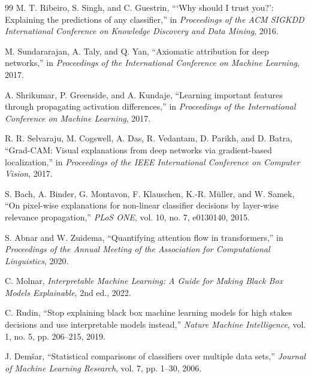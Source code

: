\documentclass[10pt,conference]{IEEEtran}
\begin{document}
\begin{thebibliography}{99}
M. T. Ribeiro, S. Singh, and C. Guestrin, ```Why should I trust you?':
Explaining the predictions of any classifier,'' in \emph{Proceedings of
the ACM SIGKDD International Conference on Knowledge Discovery and Data
Mining}, 2016.

M. Sundararajan, A. Taly, and Q. Yan, ``Axiomatic attribution for deep
networks,'' in \emph{Proceedings of the International Conference on
Machine Learning}, 2017.

A. Shrikumar, P. Greenside, and A. Kundaje, ``Learning important
features through propagating activation differences,'' in
\emph{Proceedings of the International Conference on Machine Learning},
2017.

R. R. Selvaraju, M. Cogswell, A. Das, R. Vedantam, D. Parikh, and
D. Batra, ``Grad-CAM: Visual explanations from deep networks via
gradient-based localization,'' in \emph{Proceedings of the IEEE
International Conference on Computer Vision}, 2017.

S. Bach, A. Binder, G. Montavon, F. Klauschen, K.-R. M\"uller, and
W. Samek, ``On pixel-wise explanations for non-linear classifier
decisions by layer-wise relevance propagation,'' \emph{PLoS ONE},
vol. 10, no. 7, e0130140, 2015.

S. Abnar and W. Zuidema, ``Quantifying attention flow in transformers,''
in \emph{Proceedings of the Annual Meeting of the Association for
Computational Linguistics}, 2020.

C. Molnar, \emph{Interpretable Machine Learning: A Guide for Making Black
Box Models Explainable}, 2nd ed., 2022.

C. Rudin, ``Stop explaining black box machine learning models for high
stakes decisions and use interpretable models instead,'' \emph{Nature
Machine Intelligence}, vol. 1, no. 5, pp. 206--215, 2019.

J. Dem\v{s}ar, ``Statistical comparisons of classifiers over multiple
data sets,'' \emph{Journal of Machine Learning Research}, vol. 7,
pp. 1--30, 2006.


\end{thebibliography}
\end{document}
